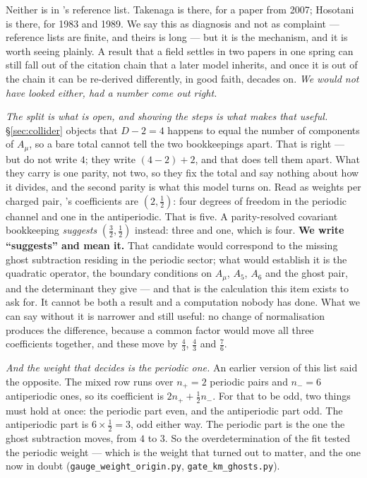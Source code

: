 \documentclass[11pt,a4paper]{article}
\begin{document}
\begin{itemize}
Neither is in \cite{KM25}'s reference list. Takenaga is there, for a paper from 2007; Hosotani is
there, for 1983 and 1989. We say this as diagnosis and not as complaint --- reference lists are
finite, and theirs is long --- but it is the mechanism, and it is worth seeing plainly. A result
that a field settles in two papers in one spring can still fall out of the citation chain that a
later model inherits, and once it is out of the chain it can be re-derived differently, in good
faith, decades on. \emph{We would not have looked either, had a number come out right.}

\emph{The split is what is open, and showing the steps is what makes that useful.}
\S\ref{sec:collider} objects that $D-2=4$ happens to equal the number of components of $A_\mu$, so
a bare total cannot tell the two bookkeepings apart. That is right --- but \cite{HNT} do not write
$4$; they write $(4-2)+2$, and that does tell them apart. What they carry is one parity, not two,
so they fix the total and say nothing about how it divides, and the second parity is what this
model turns on. Read as weights
per charged pair, \cite{KM25}'s coefficients are $(2,\tfrac12)$: four degrees of freedom in the
periodic channel and one in the antiperiodic. That is five. A parity-resolved covariant bookkeeping
\emph{suggests} $(\tfrac32,\tfrac12)$ instead: three and one, which is four. \textbf{We write
``suggests'' and mean it.} That candidate would correspond to the missing ghost subtraction
residing in the periodic sector; what would establish it is the quadratic operator, the boundary
conditions on $A_\mu$, $A_5$, $A_6$ and the ghost pair, and the determinant they give --- and that
is the calculation this item exists to ask for. It cannot be both a result and a computation
nobody has done. What we can say without it is narrower and still useful: no change of
normalisation produces the difference, because a common factor would move all three coefficients
together, and these move by $\tfrac43$, $\tfrac43$ and $\tfrac76$.

\emph{And the weight that decides is the periodic one.} An earlier version of this list said the
opposite. The mixed row runs over $n_+=2$ periodic pairs and $n_-=6$ antiperiodic ones, so its
coefficient is $2n_++\tfrac12 n_-$. For that to be odd, two things must hold at once: the periodic
part even, and the antiperiodic part odd. The antiperiodic part is $6\times\tfrac12=3$, odd either
way. The periodic part is the one the ghost subtraction moves, from $4$ to $3$. So the
overdetermination of the fit tested the periodic weight --- which is the weight that turned out to
matter, and the one now in doubt
(\texttt{gauge\_\allowbreak weight\_\allowbreak origin.py},
\texttt{gate\_\allowbreak km\_\allowbreak ghosts.py}).


\end{itemize}
\end{document}
